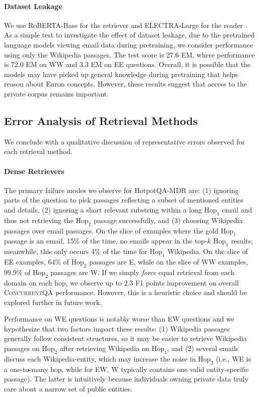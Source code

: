 \documentclass{article}
\renewcommand\cite{\citep}	\newcommand\shortcite{\citeyearpar}\newcommand\newcite{\citet}
\newcommand{\datasetname}{\textsc{ConcurrentQA}\xspace}
\begin{document}
\paragraph{Dataset Leakage} 
We use RoBERTA-Base for the retriever \cite{liu2019roberta}
and ELECTRA-Large for the reader
\cite{clark2020electra}. As a simple test to investigate the effect of dataset leakage, due to the pretrained language models viewing email data during pretraining, we consider performance using only the Wikipedia passages. The test score is 27.6 EM, where performance is 72.0 EM on WW and 3.3 EM on EE questions. Overall, it is possible that the models may have picked up general knowledge during pretraining that helps reason about Enron concepts. However, these results suggest that access to the private corpus remains important. 



\subsection{Error Analysis of Retrieval Methods} 
We conclude with a qualitative discussion of representative errors observed for each retrieval method. 
\paragraph{Dense Retrievers} The primary failure modes we observe for HotpotQA-MDR are: (1) ignoring parts of the question to pick passages reflecting a subset of mentioned entities and details, 
(2) ignoring a short relevant substring within a long $\mathrm{Hop_1}$ email and thus not retrieving the $\mathrm{Hop_2}$ passage successfully,
and (3) choosing Wikipedia passages over email passages. On the slice of examples where the gold $\mathrm{Hop_1}$ passage is an email, 15\% of the time, no emails appear in the top-$k$ $\mathrm{Hop_1}$ results; meanwhile, this only occurs 4\% of the time for $\mathrm{Hop_1}$ Wikipedia. On the slice of EE examples, 64\% of $\mathrm{Hop_2}$ passages are E, while on the slice of WW examples, 99.9\% of $\mathrm{Hop_2}$ passages are W. If we simply \textit{force} equal retrieval from each domain on each hop, we observe up to $2.3$ F1 points improvement on overall \datasetname performance. However, this is a heuristic choice and should be explored further in future work.

Performance on WE questions is notably worse than EW questions and we hypothesize that two factors impact these results: (1) Wikipedia passages generally follow consistent structures,
so it may be easier to retrieve Wikipedia passages on $\mathrm{Hop_2}$ after retrieving Wikipedia on $\mathrm{Hop_1}$, and (2) several emails discuss each Wikipedia-entity, which may increase the noise in $\mathrm{Hop_2}$ (i.e., WE is a one-to-many hop, while for EW, W typically contains one valid entity-specific passage). The latter is intuitively because individuals owning private data truly care about a narrow set of public entities.
\end{document}
